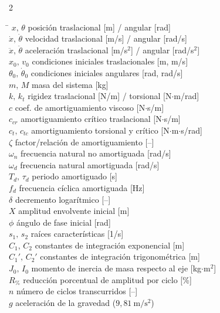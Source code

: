 \documentclass[10pt,a4paper]{article}
\begin{document}
\begin{multicols}{2}
\begin{tabbing}
\hspace{1.35cm}\=\kill
$x,\,\theta$ \> posición traslacional [m] / angular [rad] \\
$\dot{x},\,\dot{\theta}$ \> velocidad traslacional [m/s] / angular [rad/s] \\
$\ddot{x},\,\ddot{\theta}$ \> aceleración traslacional [m/s$^2$] / angular [rad/s$^2$] \\
$x_0,\,v_0$ \> condiciones iniciales traslacionales [m, m/s] \\
$\theta_0,\,\dot{\theta}_0$ \> condiciones iniciales angulares [rad, rad/s] \\
$m,\,M$ \> masa del sistema [kg] \\
$k,\,k_t$ \> rigidez traslacional [N/m] / torsional [N$\cdot$m/rad] \\
$c$ \> coef. de amortiguamiento viscoso [N$\cdot$s/m] \\
$c_{cr}$ \> amortiguamiento crítico traslacional [N$\cdot$s/m] \\
$c_t,\,c_{tc}$ \> amortiguamiento torsional y crítico [N$\cdot$m$\cdot$s/rad] \\
$\zeta$ \> factor/relación de amortiguamiento [--] \\
$\omega_n$ \> frecuencia natural no amortiguada [rad/s] \\
$\omega_d$ \> frecuencia natural amortiguada [rad/s] \\
$T_d,\,\tau_d$ \> periodo amortiguado [s] \\
$f_d$ \> frecuencia cíclica amortiguada [Hz] \\
$\delta$ \> decremento logarítmico [--] \\
$X$ \> amplitud envolvente inicial [m] \\
$\phi$ \> ángulo de fase inicial [rad] \\
$s_1,\,s_2$ \> raíces características [1/s] \\
$C_1,\,C_2$ \> constantes de integración exponencial [m] \\
$C_1',\,C_2'$ \> constantes de integración trigonométrica [m] \\
$J_0,\,I_0$ \> momento de inercia de masa respecto al eje [kg$\cdot$m$^2$] \\
$R_{\%}$ \> reducción porcentual de amplitud por ciclo [\%] \\
$n$ \> número de ciclos transcurridos [--] \\
$g$ \> aceleración de la gravedad ($9{,}81\ \mathrm{m/s^2}$) \\
\end{tabbing}

\end{multicols}
\end{document}
